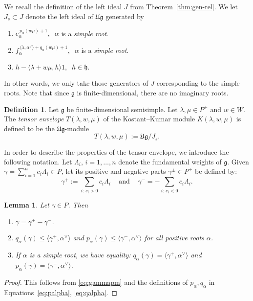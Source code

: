 \documentclass[12pt,reqno]{amsart}
\theoremstyle{plain}
\newtheorem{lemma}[theorem]{Lemma}
\theoremstyle{definition}
\newtheorem{defn}[theorem]{Definition}
\theoremstyle{remark}
\theoremstyle{plain}
\newcommand{\lie}{\mathfrak}
\begin{document}
\subsection{}
We recall the definition of the left ideal $J$ from Theorem~\ref{thm:gen-rel}.
We let $J_s \subset J$ denote the left ideal of $\mathfrak{Ug}$ generated by
\begin{enumerate}
        \item $e_\alpha^{\,p_\alpha (w\mu)+1}, \;\; \alpha$ is a {\em simple root}.
        \item $f_\alpha^{\,\langle \lambda, \alpha^\vee \rangle + q_\alpha (w\mu)+1}, \;\; \alpha$ is a {\em simple root}. 
        \item $ h - \langle \lambda + w\mu, h \rangle 1, \;\; h \in \mathfrak{h}$.
\end{enumerate}
In other words, we only take those generators of $J$ corresponding to the simple roots. Note that  since $\mathfrak{g}$ is finite-dimensional, there are no imaginary roots.

\begin{defn} Let $\mathfrak{g}$ be finite-dimensional semisimple. Let $\lambda, \mu \in P^+$ and $w \in W$.
The {\em tensor envelope}  $T(\lambda, w, \mu)$ of the Kostant--Kumar module $K(\lambda,w,\mu)$ is defined to be the $\mathfrak{Ug}$-module $$T(\lambda,w,\mu) := \mathfrak{Ug}/J_s.$$
\end{defn}

In order to describe the properties of the tensor envelope, we introduce the following notation. Let $\Lambda_i, \, i=1, \ldots, n$ denote the fundamental weights of $\lie g$. Given $\gamma = \sum_{i=1}^n c_i \Lambda_i \in P$, let its positive and negative parts $\gamma^{\pm} \in P^+$ be defined by:
\begin{equation}\label{eq:gammapm}
     \gamma^+ :=\sum_{i: \, c_i >0} c_i \Lambda_i \;\;\;\text{ and }\;\;\;
\gamma^- = -\sum_{i: \, c_i <0} c_i \Lambda_i.
\end{equation}

\begin{lemma}\label{lem:gammapmlem} Let $\gamma \in P$. Then
\begin{enumerate}
    \item $\gamma = \gamma^+ - \gamma^-$.
    \item $q_\alpha(\gamma) \leq \langle \gamma^+, \alpha^\vee \rangle  $ and $p_\alpha(\gamma) \leq \langle \gamma^-, \alpha^\vee \rangle$ for all positive roots $\alpha$.
    \item If $\alpha$ is a {\em simple root}, we have equality: $q_\alpha(\gamma) = \langle \gamma^+, \alpha^\vee \rangle  $ and $p_\alpha(\gamma) = \langle \gamma^-, \alpha^\vee \rangle$.
\end{enumerate}    
\end{lemma}
\begin{proof}
This follows from \eqref{eq:gammapm} and the definitions of $p_\alpha, q_\alpha$ in Equations~\eqref{eq:palpha}, \eqref{eq:qalpha}.
\end{proof}
\end{document}
